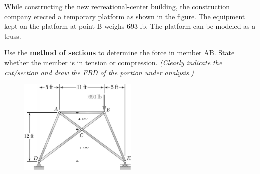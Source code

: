 
\noindent While constructing the new recreational-center building, the construction company erected a temporary platform as shown in the figure. The equipment kept on the platform at point B weighs 693 lb. The platform can be modeled as a truss. 

\noindent Use the \textbf{method of sections} to determine the force in member AB.  State whether the member is in tension or compression. \textit{(Clearly indicate the cut/section and draw the FBD of the portion under analysis.)}

\begin{figure}[ht!]
  \centering
  \includegraphics[width=0.5\textwidth,
	           height=0.4\textheight,
		   keepaspectratio]{fig-qz.png}
\end{figure}


